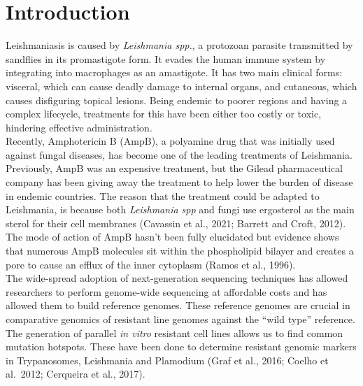 \documentclass{bioinfo}
\begin{document}
\maketitle

\section{Introduction}

Leishmaniasis is caused by \emph{Leishmania spp.}, a protozoan parasite
transmitted by sandflies in its promastigote form. It evades the human
immune system by integrating into macrophages as an amastigote. It has
two main clinical forms: visceral, which can cause deadly damage to
internal organs, and cutaneous, which causes disfiguring topical
lesions. Being endemic to poorer regions and having a complex lifecycle,
treatments for this have been either too costly or toxic, hindering
effective administration.\\

Recently, Amphotericin B (AmpB), a polyamine drug that was initially
used against fungal diseases, has become one of the leading treatments
of Leishmania. Previously, AmpB was an expensive treatment, but the
Gilead pharmaceutical company has been giving away the treatment to help
lower the burden of disease in endemic countries. The reason that the
treatment could be adapted to Leishmania, is because both
\emph{Leishmania spp} and fungi use ergosterol as the main sterol for
their cell membranes (Cavassin et al., 2021; Barrett and Croft, 2012).
The mode of action of AmpB hasn't been fully elucidated but evidence
shows that numerous AmpB molecules sit within the phospholipid bilayer
and creates a pore to cause an efflux of the inner cytoplasm (Ramos et
al., 1996).\\

The wide-spread adoption of next-generation sequencing techniques has
allowed researchers to perform genome-wide sequencing at affordable
costs and has allowed them to build reference genomes. These reference
genomes are crucial in comparative genomics of resistant line genomes
against the ``wild type'' reference. The generation of parallel \emph{in
vitro} resistant cell lines allows us to find common mutation hotspots.
These have been done to determine resistant genomic markers in
Trypanosomes, Leishmania and Plamodium (Graf et al., 2016; Coelho et
al.~2012; Cerqueira et al., 2017).\\
\end{document}
